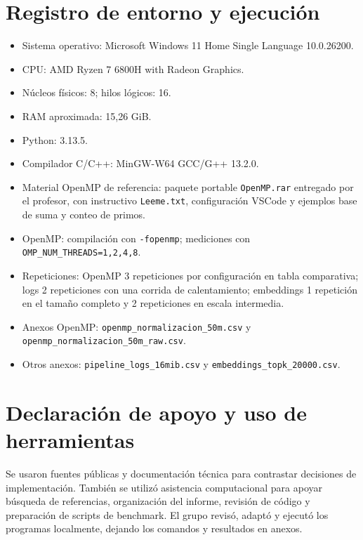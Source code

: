 \documentclass[letterpaper,11pt]{article}
\begin{document}
\section*{Registro de entorno y ejecución}

\begin{itemize}[itemsep=0.1cm]
    \item Sistema operativo: Microsoft Windows 11 Home Single Language 10.0.26200.
    \item CPU: AMD Ryzen 7 6800H with Radeon Graphics.
    \item Núcleos físicos: 8; hilos lógicos: 16.
    \item RAM aproximada: 15,26 GiB.
    \item Python: 3.13.5.
    \item Compilador C/C++: MinGW-W64 GCC/G++ 13.2.0.
    \item Material OpenMP de referencia: paquete portable \texttt{OpenMP.rar} entregado por el profesor, con instructivo \texttt{Leeme.txt}, configuración VSCode y ejemplos base de suma y conteo de primos.
    \item OpenMP: compilación con \texttt{-fopenmp}; mediciones con \texttt{OMP\_NUM\_THREADS=1,2,4,8}.
    \item Repeticiones: OpenMP 3 repeticiones por configuración en tabla comparativa; logs 2 repeticiones con una corrida de calentamiento; embeddings 1 repetición en el tamaño completo y 2 repeticiones en escala intermedia.
    \item Anexos OpenMP: \texttt{openmp\_normalizacion\_50m.csv} y \texttt{openmp\_normalizacion\_50m\_raw.csv}.
    \item Otros anexos: \texttt{pipeline\_logs\_16mib.csv} y \texttt{embeddings\_topk\_20000.csv}.
\end{itemize}

\section*{Declaración de apoyo y uso de herramientas}

Se usaron fuentes públicas y documentación técnica para contrastar decisiones de implementación. También se utilizó asistencia computacional para apoyar búsqueda de referencias, organización del informe, revisión de código y preparación de scripts de benchmark. El grupo revisó, adaptó y ejecutó los programas localmente, dejando los comandos y resultados en anexos.
\end{document}
